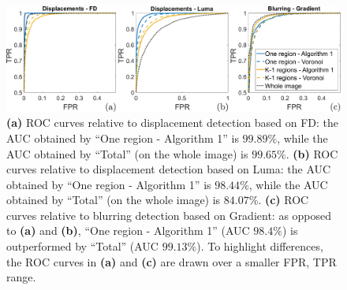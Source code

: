 \documentclass{llncs}
\begin{document}
\begin{figure}[t]
\centering
\includegraphics[width=1\linewidth]{Immagini/curve}
\caption{\textbf{(a)} ROC curves relative to displacement detection based on FD: the AUC obtained by 
``One region - Algorithm 1'' is $99.89\%$, while the AUC obtained by ``Total'' (on the whole 
image) is $99.65\%$.
\textbf{(b)} ROC curves relative to displacement detection based on Luma: the AUC obtained by 
``One region - Algorithm 1'' is $98.44\%$, while the AUC obtained by ``Total'' (on the whole 
image) is $84.07\%$.
\textbf{(c)} ROC curves relative to blurring detection based on Gradient: as opposed to \textbf{(a)} and 
\textbf{(b)}, ``One region - Algorithm 1'' (AUC $98.4\%$) is outperformed by ``Total'' (AUC $99.13\%$).
To highlight differences, the ROC curves in \textbf{(a)} and \textbf{(c)} are drawn over a smaller FPR, TPR range.}
\label{fig:ROC}
\end{figure}
\end{document}
